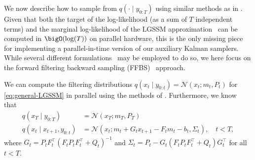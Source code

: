 We now describe how to sample from $q(\cdot \mid y_{0:T})$ using similar methods as in \citet{Sarkka2021temporal,yaghoobi2021parallel,Yaghoobi2022sqrt}. Given that both the target of the log-likelihood (as a sum of $T$ independent terms) and the marginal log-likelihood of the LGSSM approximation~\citep{Sarkka2021temporal} can be computed in $\bigO(\log(T))$ on parallel hardware, this is the only missing piece for implementing a parallel-in-time version of our auxiliary Kalman samplers. While several different formulations~\citep[see, e.g.,][]{Doucet:2010,Fruhwirth1994data} may be employed to do so, we here focus on the forward filtering backward sampling (FFBS)~\citep{Fruhwirth1994data} approach.

We can compute the filtering distributions $q(x_t \mid y_{0:t}) = \mathcal{N}(x_t; m_t, P_t)$ for \eqref{eq:general-LGSSM} in parallel using the methods of \citet{Sarkka2021temporal}. Furthermore, we know~\citep[by adding a bias term to][Proposition 1]{Fruhwirth1994data} that
\begin{equation}
    \label{eq:backward}
    \begin{split}
        q(x_T \mid y_{0:T}) &= \mathcal{N}(x_T; m_T, P_T) \\
        q(x_t \mid x_{t+1}, y_{0:t}) &= \mathcal{N}\left(x_t; m_t + G_{t} x_{t+1} - F_t m_t - b_t, \Sigma_t\right), \quad t < T,
    \end{split}
\end{equation}
where $G_t = P_t F_t^{\top}\left(F_t P_t F_t^{\top} + Q_t\right)^{-1}$ and $\Sigma_t = P_t - G_t (F_t P_t F_t^{\top} + Q_t) G_t^{\top}$ for all $t < T$.

